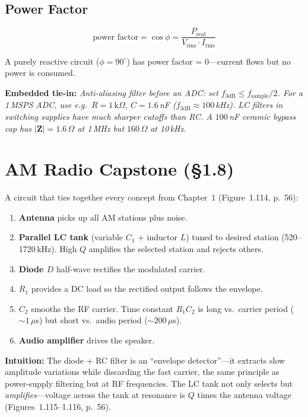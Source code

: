 \documentclass[11pt,a4paper]{article}
\newcommand{\intuition}[1]{\par\textcolor{intuition}{\textbf{Intuition:}} #1}
\newcommand{\embedded}[1]{\par\textcolor{embed}{\textbf{Embedded tie-in:}} \textit{#1}}
\begin{document}
\subsection{Power Factor}

\begin{equation}
\text{power factor} = \cos\phi = \frac{P_{\text{real}}}{V_{\text{rms}} \cdot I_{\text{rms}}}
\end{equation}

A purely reactive circuit ($\phi = 90^\circ$) has power factor = 0---current flows but no power is consumed.

\embedded{Anti-aliasing filter before an ADC: set $f_{3\text{dB}} \leq f_{\text{sample}}/2$. For a 1\,MSPS ADC, use e.g.\ $R = 1\,\text{k}\Omega$, $C = 1.6\,$nF ($f_{3\text{dB}} \approx 100\,$kHz). LC filters in switching supplies have much sharper cutoffs than RC. A $100\,$nF ceramic bypass cap has $|\mathbf{Z}| = 1.6\,\Omega$ at 1\,MHz but $160\,\Omega$ at 10\,kHz.}

\section{AM Radio Capstone (\S1.8)}

A circuit that ties together every concept from Chapter~1 (Figure~1.114, p.~56):

\begin{enumerate}[nosep]
\item \textbf{Antenna} picks up all AM stations plus noise.
\item \textbf{Parallel LC tank} (variable $C_1$ + inductor $L$) tuned to desired station (520--1720\,kHz). High $Q$ amplifies the selected station and rejects others.
\item \textbf{Diode $D$} half-wave rectifies the modulated carrier.
\item \textbf{$R_1$} provides a DC load so the rectified output follows the envelope.
\item \textbf{$C_2$} smooths the RF carrier. Time constant $R_1 C_2$ is long vs.\ carrier period ($\sim 1\,\mu$s) but short vs.\ audio period ($\sim 200\,\mu$s).
\item \textbf{Audio amplifier} drives the speaker.
\end{enumerate}

\intuition{The diode + RC filter is an ``envelope detector''---it extracts slow amplitude variations while discarding the fast carrier, the same principle as power-supply filtering but at RF frequencies. The LC tank not only selects but \emph{amplifies}---voltage across the tank at resonance is $Q$ times the antenna voltage (Figures~1.115--1.116, p.~56).}
\end{document}
